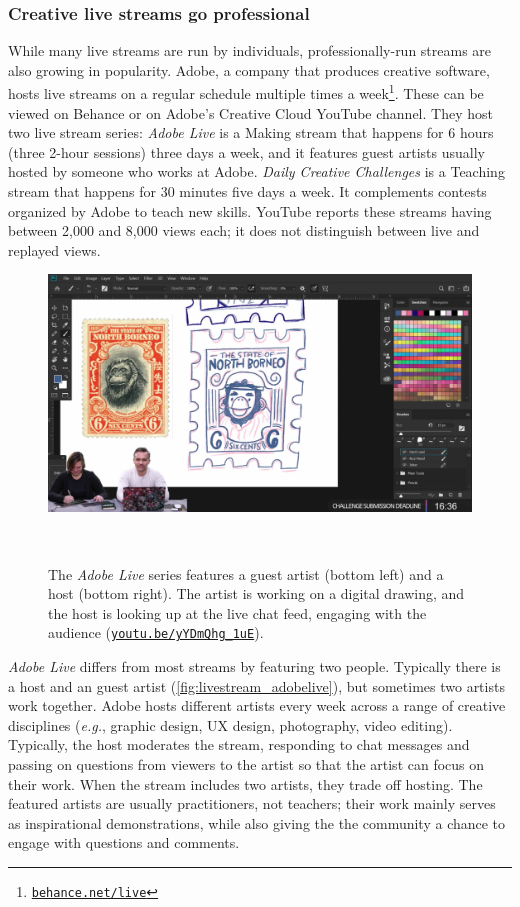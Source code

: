 \subsubsection{Creative live streams go professional}
While many live streams are run by individuals, professionally-run streams are also growing in popularity. Adobe, a company that produces creative software, hosts live streams on a regular schedule multiple times a week\footnote{\href{https://behance.net/live}{\nolinkurl{behance.net/live}}}. These can be viewed on Behance or on Adobe's Creative Cloud YouTube channel. They host two live stream series: \textit{Adobe Live} is a Making stream that happens for 6 hours (three 2-hour sessions) three days a week, and it features guest artists usually hosted by someone who works at Adobe. \textit{Daily Creative Challenges} is a Teaching stream that happens for 30 minutes five days a week. It complements contests organized by Adobe to teach new skills. YouTube reports these streams having between 2,000 and 8,000 views each; it does not distinguish between live and replayed views.

\begin{figure}[b!]
\centering
  \includegraphics[width=0.6\columnwidth]{liveclips/figures/adobelive.png}
  \caption{The \textit{Adobe Live} series features a guest artist (bottom left) and a host (bottom right). The artist is working on a digital drawing, and the host is looking up at the live chat feed, engaging with the audience (\href{https://youtu.be/yYDmQhg_1uE}{\nolinkurl{youtu.be/yYDmQhg_1uE}}). }~\label{fig:livestream_adobelive}
\end{figure}

\textit{Adobe Live} differs from most streams by featuring two people. Typically there is a host and an guest artist (\autoref{fig:livestream_adobelive}), but sometimes two artists work together. Adobe hosts different artists every week across a range of creative disciplines (\textit{e.g.}, graphic design, UX design, photography, video editing). Typically, the host moderates the stream, responding to chat messages and passing on questions from viewers to the artist so that the artist can focus on their work. When the stream includes two artists, they trade off hosting.
The featured artists are usually practitioners, not teachers; their work mainly serves as inspirational demonstrations, while also giving the the community a chance to engage with questions and comments. 

